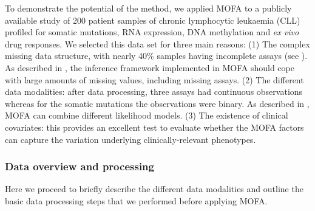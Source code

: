 To demonstrate the potential of the method, we applied MOFA to a publicly available study of 200 patient samples of chronic lymphocytic leukaemia (CLL) profiled for somatic mutations, RNA expression, DNA methylation and \textit{ex vivo} drug responses\cite{Dietrich2018}. We selected this data set for three main reasons: (1) The complex missing data structure, with nearly 40\% samples having incomplete assays (see ). As described in , the inference framework implemented in MOFA should cope with large amounts of missing values, including missing assays. (2) The different data modalities: after data processing, three assays had continuous observations whereas for the somatic mutations the observations were binary. As described in , MOFA can combine different likelihood models. (3) The existence of clinical covariates: this provides an excellent test to evaluate whether the MOFA factors can capture the variation underlying clinically-relevant phenotypes.

\subsubsection{Data overview and processing}





Here we proceed to briefly describe the different data modalities and outline the basic data processing steps that we performed before applying MOFA.

